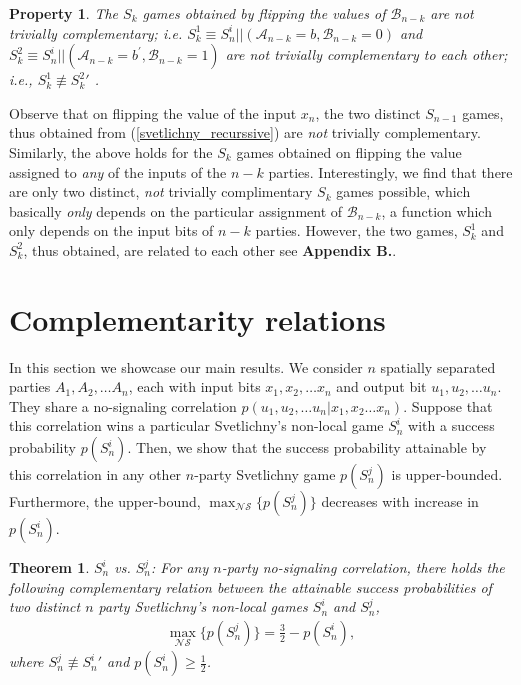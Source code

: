 \documentclass[%
 reprint,
 amsmath,amssymb,
 aps,
]{revtex4-1}
\theoremstyle{plain}
\newtheorem{theorem}{Theorem}
\newtheorem{property}{Property}
\begin{document}
\begin{property}
\label{fixing_one_fixes_another}
The $S_k$ games obtained by flipping the values of $\mathcal{B}_{n-k}$ are \textit{not} trivially complementary; i.e. $S_k^1\equiv S_n^i||(\mathcal{A}_{n-k}=b,\mathcal{B}_{n-k}=0)$ and $S_k^2\equiv S_n^i||(\mathcal{A}_{n-k}=b^{'},\mathcal{B}_{n-k}=1)$ are \textit{not} trivially complementary to each other; i.e., $S_k^1 \not \equiv {S_k^2}'$ . 
\end{property}
Observe that on flipping the value of the input $x_n$, the two distinct $S_{n-1}$ games, thus obtained from (\ref{svetlichny_recurssive}) are \textit{not} trivially complementary. Similarly, the above holds for the $S_k$ games obtained on flipping the value assigned to \textit{any} of the inputs of the $n-k$ parties. Interestingly, we find that there are only two distinct, \textit{not} trivially complimentary $S_k$ games possible, which basically \textit{only} depends on the particular assignment of $\mathcal{B}_{n-k}$, a function which only depends on the input bits of $n-k$ parties. However, the two games, $S_k^1$ and $S_k^2$, thus obtained, are related to each other see \textbf{Appendix B.}. 
\section{Complementarity relations}
In this section we showcase our main results. We consider $n$ spatially separated parties $A_1,A_2, \ldots A_n$, each with input bits $x_1,x_2, \ldots x_n$ and output bit $u_1,u_2, \ldots u_n$. They share a no-signaling correlation $p(u_1,u_2, \ldots u_n|x_1,x_2 \ldots x_n )$. Suppose that this correlation wins a particular Svetlichny's non-local game $S_n^i$ with a success probability $p(S_n^i)$. Then, we show that the success probability attainable by this correlation in any other $n$-party Svetlichny game $p(S_n^j)$ is upper-bounded. Furthermore, the upper-bound, $\max_{\mathcal{NS}}\{p(S_n^j)\}$ decreases with increase in $p(S_n^i)$.  
\begin{theorem}
\label{thm_1} \textit{$S_n^i$ vs. $S_n^j$}: For any $n$-party no-signaling correlation, there holds the following complementary relation between the attainable success probabilities of two distinct $n$ party Svetlichny's non-local games $S_n^i$ and $S_n^j$,
\begin{eqnarray}
\label{snsn}
\max_{\mathcal{NS}}\{p(S^j_n)\}=
      \frac{3}{2}-p({S_n^i}),
\end{eqnarray} 
where $S_n^j \not \equiv {S_n^i}'$ and $p(S_n^i)\ge \frac{1}{2}$.
\end{theorem}
\end{document}
